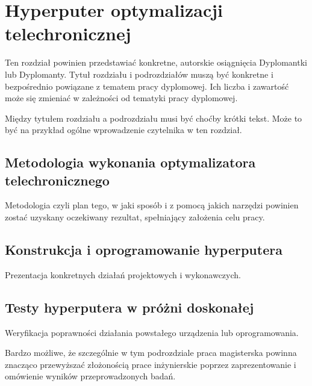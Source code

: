 \chapter{Hyperputer optymalizacji telechronicznej}

Ten rozdział powinien przedstawiać konkretne, autorskie osiągnięcia Dyplomantki lub Dyplomanty. Tytuł rozdziału i podrozdziałów muszą być konkretne i bezpośrednio powiązane z tematem pracy dyplomowej. Ich liczba i zawartość może się zmieniać w zależności od tematyki pracy dyplomowej.

Między tytułem rozdziału a podrozdziału musi być choćby krótki tekst. Może to być na przykład ogólne wprowadzenie czytelnika w ten rozdział.

\section{Metodologia wykonania optymalizatora telechronicznego}

Metodologia czyli plan tego, w jaki sposób i z pomocą jakich narzędzi powinien zostać uzyskany oczekiwany rezultat, spełniający założenia celu pracy.

\section{Konstrukcja i oprogramowanie hyperputera}

Prezentacja konkretnych działań projektowych i wykonawczych.

\section{Testy hyperputera w próżni doskonałej}

Weryfikacja poprawności działania powstałego urządzenia lub oprogramowania.

Bardzo możliwe, że szczególnie w tym podrozdziale praca magisterska powinna znacząco przewyższać złożonością prace inżynierskie poprzez zaprezentowanie i omówienie wyników przeprowadzonych badań.
